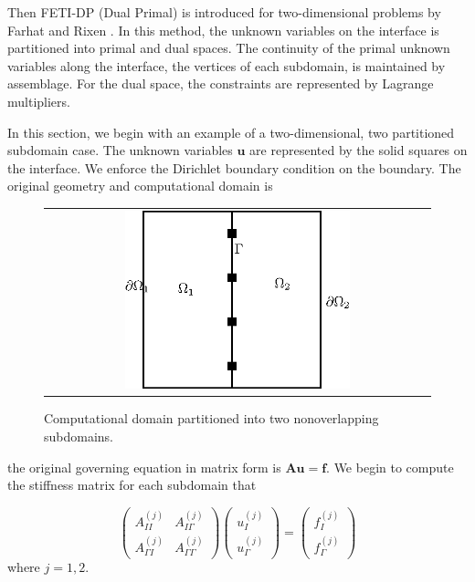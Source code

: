 Then FETI-DP (Dual Primal) is introduced for two-dimensional problems by Farhat and Rixen \cite{farhat2001feti}. In this method, the unknown variables on the interface is partitioned into primal and dual spaces. The continuity of the primal unknown variables along the interface, the vertices of each subdomain, is maintained by assemblage. For the dual space, the constraints are represented by Lagrange multipliers. 

In this section, we begin with an example of a two-dimensional, two partitioned subdomain case. The unknown variables $ \mathbf{u} $ are represented by the solid squares on the interface. We enforce the Dirichlet boundary condition on the boundary. The original geometry and computational domain is  

\begin{figure}[h]
	\centering
	\begin{tabular}{c}
		\includegraphics[width=0.6\textwidth]{./pics/feti1}
	\end{tabular}
	\caption{\footnotesize Computational domain partitioned into two nonoverlapping subdomains.}\label{fig4: feti1}
\end{figure}

the original governing equation in matrix form is $ \mathbf{A} \mathbf{u} = \mathbf{f} $. We begin to compute the stiffness matrix for each subdomain that

\begin{equation}
 \begin{pmatrix}
A_{II}^{(j)} & A_{I\Gamma}^{(j)} \\
A_{\Gamma I}^{(j)} & A_{\Gamma \Gamma}^{(j)}
\end{pmatrix} \begin{pmatrix}
u_{I}^{(j)} \\ u_{\Gamma}^{(j)}
\end{pmatrix} = \begin{pmatrix}
f_{I}^{(j)} \\ f_{\Gamma}^{(j)}
\end{pmatrix}
\end{equation}
where $ j = 1, 2 $.


